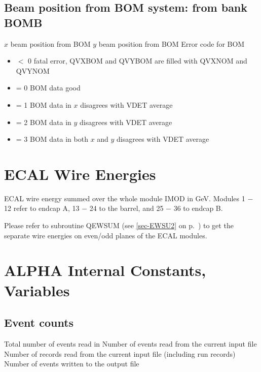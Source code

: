\subsection{\label{sec-BOM}Beam position from BOM system: from bank BOMB}
\par
\begin{indentlist}{ 2.50cm}{ 2.75cm}
$x$ beam position from BOM
$y$ beam position from BOM
Error code for BOM
\begin{itemize}
\item $<$ 0 fatal error, QVXBOM and QVYBOM are filled with QVXNOM and QVYNOM
\item = 0 BOM data good
\item = 1 BOM data in $x$ disagrees with VDET average
\item = 2 BOM data in $y$ disagrees with VDET average
\item = 3 BOM data in both $x$ and $y$ disagrees with VDET average
\end{itemize}
\end{indentlist}
\section{\label{sec-ECWI}ECAL Wire Energies}
\begin{indentlist}{ 2.50cm}{ 2.75cm}
\par
{}ECAL wire energy summed over the whole module IMOD in GeV.
Modules 1 $-$ 12 refer to endcap A, 13 $-$ 24 to the barrel, and 25
$-$ 36 to endcap
B.
\end{indentlist}

Please refer to subroutine QEWSUM (see \ref{sec-EWSU2} on p.~\pageref{sec-EWSU2}) to get
the separate wire energies on even/odd planes of the ECAL modules.

\section{\label{sec-MC}ALPHA Internal Constants, Variables}
\par
\subsection{\label{sec-MCN}Event counts}
\par
\begin{indentlist}{ 2.50cm}{ 2.75cm}
Total number of events read in
Number of events read from the current input file
Number of records read from the current input file
(including run records)
Number of events written to the output file
\end{indentlist}
